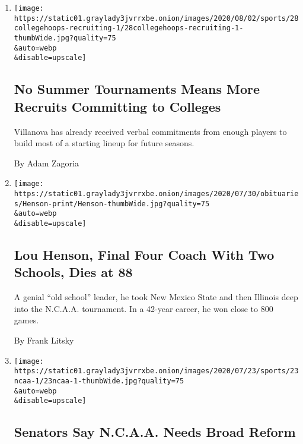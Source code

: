 \begin{enumerate}
\def\labelenumi{\arabic{enumi}.}
\item
  \href{/2020/07/30/sports/ncaabasketball/college-basketball-recruiting.html}{}

  \texttt{[image: https://static01.graylady3jvrrxbe.onion/images/2020/08/02/sports/28collegehoops-recruiting-1/28collegehoops-recruiting-1-thumbWide.jpg?quality=75\\\&auto=webp\\\&disable=upscale]}

  \hypertarget{no-summer-tournaments-means-more-recruits-committing-to-colleges}{%
  \subsection{No Summer Tournaments Means More Recruits Committing to
  Colleges}\label{no-summer-tournaments-means-more-recruits-committing-to-colleges}}

  Villanova has already received verbal commitments from enough players
  to build most of a starting lineup for future seasons.

  By Adam Zagoria
\item
  \href{/2020/07/29/sports/ncaabasketball/lou-henson-dead.html}{}

  \texttt{[image: https://static01.graylady3jvrrxbe.onion/images/2020/07/30/obituaries/Henson-print/Henson-thumbWide.jpg?quality=75\\\&auto=webp\\\&disable=upscale]}

  \hypertarget{lou-henson-final-four-coach-with-two-schools-dies-at-88}{%
  \subsection{Lou Henson, Final Four Coach With Two Schools, Dies at
  88}\label{lou-henson-final-four-coach-with-two-schools-dies-at-88}}

  A genial ``old school'' leader, he took New Mexico State and then
  Illinois deep into the N.C.A.A. tournament. In a 42-year career, he
  won close to 800 games.

  By Frank Litsky
\item
  \href{/2020/07/23/sports/ncaa-NIL-rights.html}{}

  \texttt{[image: https://static01.graylady3jvrrxbe.onion/images/2020/07/23/sports/23ncaa-1/23ncaa-1-thumbWide.jpg?quality=75\\\&auto=webp\\\&disable=upscale]}

  \hypertarget{senators-say-ncaa-needs-broad-reform}{%
  \subsection{Senators Say N.C.A.A. Needs Broad
  Reform}\label{senators-say-ncaa-needs-broad-reform}}


\end{enumerate}
